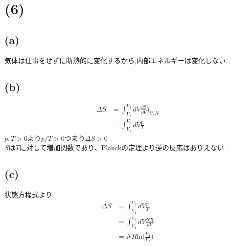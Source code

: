 \section*{(6)}
\subsection*{(a)}
気体は仕事をせずに断熱的に変化するから,内部エネルギーは変化しない.
\subsection*{(b)}
\begin{align*}
  \Delta S 
  &= \int^{V_2}_{V_1} dV \frac{\partial S}{\partial V} \bigg)_{U,N}\\
  &=\int^{V_2}_{V_1} dV \frac{p}{T}
\end{align*}
$p,T>0$より$p/T>0$つまり$\Delta S > 0$\\
$S$は$T$に対して増加関数であり、Planckの定理より逆の反応はありえない.

\subsection*{(c)}
状態方程式より
\begin{align*}
  \Delta S 
  &=\int^{V_2}_{V_1} dV \frac{p}{T}\\
  &=\int^{V_2}_{V_1} dV \frac{NR}{dV}\\
  &=NR \text{ln}\bigg(\frac{V_2}{V_1}\bigg)
\end{align*}

